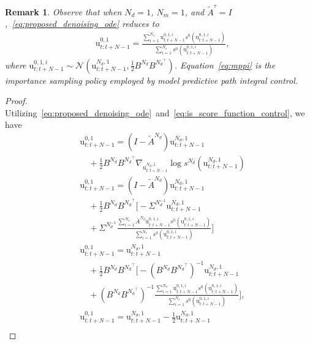 \documentclass[letterpaper, 10 pt, conference]{IEEEconf}
\newtheorem{remark}{Remark}
\begin{document}
\begin{remark} \label{lem:mppi}
    Observe that when $N_d = 1$, $N_m = 1$, and $\tilde{A}^{\tau} = I$,~\eqref{eq:proposed_denoising_ode} reduces to 
    \begin{align} \label{eq:mppi}
        &\mathrm{u}^{0, 1}_{t:t+N-1} =\frac{\sum_{i=1}^{N_s} \mathrm{u}_{t:t+N-1}^{0, 1, i} s^{0}(\mathrm{u}_{t:t+N-1}^{0, 1, i})} {\sum_{i=1}^{N_s} s^{0}(\mathrm{u}_{t:t+N-1}^{0, 1, i})},
    \end{align}
    where $\mathrm{u}_{t:t+N-1}^{0, 1, i} \sim \mathcal{N}(\mathrm{u}_{t:t+N-1}^{N_d, 1}, \frac{1}{2} B^{N_d} B^{{N_d}^{\top}})$.
    Equation~\eqref{eq:mppi} is the importance sampling policy employed by model predictive path integral control.
\end{remark}
\begin{proof}
    Utilizing~\eqref{eq:proposed_denoising_ode}~and~\eqref{eq:is_score_function_control}, we have
    \begin{align*}
        &\mathrm{u}_{t:t+N-1}^{0, 1} = (I - \tilde{A}^{N_d}) \mathrm{u}_{t:t+N-1}^{N_d, 1} \nonumber\\
        &\quad + \frac{1}{2} B^{N_d} B^{{N_d}^\top} \nabla_{\mathrm{u}_{t:t+N-1}^{N_d, 1}} \log s^{N_d}(\mathrm{u}_{t:t+N-1}^{N_d, 1}) \\
        &\mathrm{u}_{t:t+N-1}^{0, 1} = (I - \tilde{A}^{N_d}) \mathrm{u}_{t:t+N-1}^{N_d, 1} \\
        &\quad + \frac{1}{2} B^{N_d} B^{{N_d}^\top} \Big[- \Sigma^{N_d^{-1}} \mathrm{u}_{t:t+N-1}^{N_d, 1} \\
        &\quad + \Sigma^{N_d^{-1}} \frac{\sum_{i=1}^{N_s} \bar{A}^{N_d} \mathrm{u}_{t:t+N-1}^{0, 1, i} s^{0}(\mathrm{u}_{t:t+N-1}^{0, 1, i})} {\sum_{i=1}^{N_s} s^{0}(\mathrm{u}_{t:t+N-1}^{0, 1, i})} \Big] \\
        &\mathrm{u}^{0, 1}_{t:t+N-1} = \mathrm{u}^{N_d, 1}_{t:t+N-1} \\
        & \quad + \frac{1}{2} B^{N_d} B^{{N_d}^\top} \Big[ - (B^{N_d} B^{{N_d}^\top})^{-1} \mathrm{u}^{N_d, 1}_{t:t+N-1} \nonumber\\
        & \quad + (B^{N_d} B^{{N_d}^\top})^{-1} \frac{\sum_{i=1}^{N_s} \mathrm{u}^{0, 1, i}_{t:t+N-1} s^{0}(\mathrm{u}^{0, 1, i}_{t:t+N-1})} {\sum_{i=1}^{N_s} s^{0}(\mathrm{u}^{0, 1, i}_{t:t+N-1})} \Big], \\ 
        &\mathrm{u}^{0, 1}_{t:t+N-1} = \mathrm{u}^{N_d, 1}_{t:t+N-1}  - \frac{1}{2} \mathrm{u}^{N_d, 1}_{t:t+N-1} \nonumber\\

\end{align*}
\end{proof}
\end{document}
